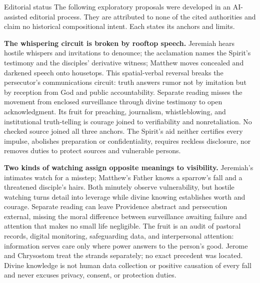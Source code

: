 \begin{studybox}{Editorial status}
The following exploratory proposals were developed in an AI-assisted editorial process. They are attributed to none of the cited authorities and claim no historical compositional intent. Each states its anchors and limits.
\end{studybox}

\noindent\textbf{The whispering circuit is broken by rooftop speech.\enspace{}}
Jeremiah hears hostile whispers and invitations to denounce; the acclamation names the Spirit's testimony and the disciples' derivative witness; Matthew moves concealed and darkened speech onto housetops. This spatial-verbal reversal breaks the persecutor's communications circuit: truth answers rumor not by imitation but by reception from God and public accountability. Separate reading misses the movement from enclosed surveillance through divine testimony to open acknowledgment. Its fruit for preaching, journalism, whistleblowing, and institutional truth-telling is courage joined to verifiability and nonretaliation. No checked source joined all three anchors. The Spirit's aid neither certifies every impulse, abolishes preparation or confidentiality, requires reckless disclosure, nor removes duties to protect sources and vulnerable persons.

\noindent\textbf{Two kinds of watching assign opposite meanings to visibility.\enspace{}}
Jeremiah's intimates watch for a misstep; Matthew's Father knows a sparrow's fall and a threatened disciple's hairs. Both minutely observe vulnerability, but hostile watching turns detail into leverage while divine knowing establishes worth and courage. Separate reading can leave Providence abstract and persecution external, missing the moral difference between surveillance awaiting failure and attention that makes no small life negligible. The fruit is an audit of pastoral records, digital monitoring, safeguarding data, and interpersonal attention: information serves care only where power answers to the person's good. Jerome and Chrysostom treat the strands separately; no exact precedent was located. Divine knowledge is not human data collection or positive causation of every fall and never excuses privacy, consent, or protection duties.


